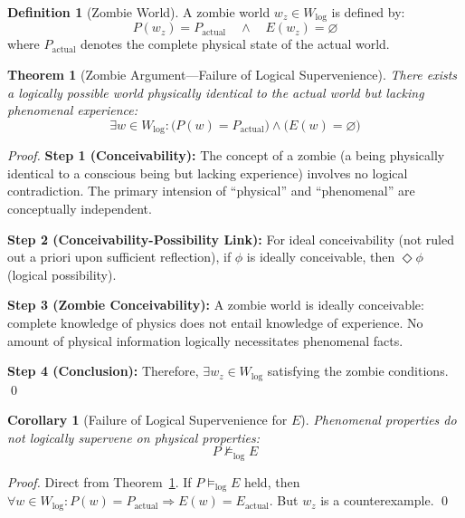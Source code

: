 \documentclass[11pt,a4paper]{article}
\theoremstyle{definition}
\newtheorem{definition}{Definition}[section]
\theoremstyle{plain}
\newtheorem{theorem}{Theorem}[section]
\newtheorem{corollary}{Corollary}[section]
\theoremstyle{remark}
\newcommand{\logent}{\vDash_{\text{log}}}
\newcommand{\notlogent}{\nvDash_{\text{log}}}
\newcommand{\Wlog}{W_{\text{log}}}
\newcommand{\Pactual}{P_{\text{actual}}}
\begin{document}
\begin{definition}[Zombie World]
A zombie world $w_z \in \Wlog$ is defined by:
\begin{equation}
P(w_z) = \Pactual \quad \land \quad E(w_z) = \varnothing
\end{equation}
where $\Pactual$ denotes the complete physical state of the actual world.
\end{definition}

\begin{theorem}[Zombie Argument---Failure of Logical Supervenience]\label{thm:zombie}
There exists a logically possible world physically identical to the actual world but lacking phenomenal experience:
\begin{equation}
\boxed{\exists w \in \Wlog : \big( P(w) = \Pactual \big) \land \big( E(w) = \varnothing \big)}
\end{equation}
\end{theorem}

\begin{proof}
\textbf{Step 1 (Conceivability):} The concept of a zombie (a being physically identical to a conscious being but lacking experience) involves no logical contradiction. The primary intension of ``physical'' and ``phenomenal'' are conceptually independent.

\textbf{Step 2 (Conceivability-Possibility Link):} For ideal conceivability (not ruled out a priori upon sufficient reflection), if $\phi$ is ideally conceivable, then $\Diamond \phi$ (logical possibility).

\textbf{Step 3 (Zombie Conceivability):} A zombie world is ideally conceivable: complete knowledge of physics does not entail knowledge of experience. No amount of physical information logically necessitates phenomenal facts.

\textbf{Step 4 (Conclusion):} Therefore, $\exists w_z \in \Wlog$ satisfying the zombie conditions. \qed
\end{proof}

\begin{corollary}[Failure of Logical Supervenience for $E$]\label{cor:no_log_supervenience}
Phenomenal properties do not logically supervene on physical properties:
\begin{equation}
\boxed{P \notlogent E}
\end{equation}
\end{corollary}

\begin{proof}
Direct from Theorem~\ref{thm:zombie}. If $P \logent E$ held, then $\forall w \in \Wlog: P(w) = \Pactual \Rightarrow E(w) = E_{\text{actual}}$. But $w_z$ is a counterexample. \qed
\end{proof}
\end{document}
